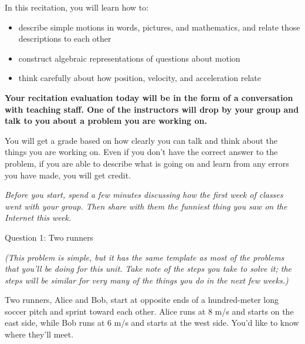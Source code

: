 \documentclass[12pt]{article}
\newcommand{\BI}{\begin{itemize}}
\newcommand{\EI}{\end{itemize}}
\def\BS{\bigskip}
\begin{document}
\Large
\centerline{}
\normalsize
\centerline{}

\medskip

\BS\BS\BS

In this recitation, you will learn how to:

\BI
\item describe simple motions in words, pictures, and mathematics, and relate those descriptions to each other
\item construct algebraic representations of questions about motion
\item think carefully about how position, velocity, and acceleration relate
\EI



\bf Your recitation evaluation today will be in the form of a conversation with teaching staff. One of the instructors will drop by your group and talk to you about a problem you are working on.
\BS


You will get a grade based on how clearly you can talk and think about the things you are working on. Even if you don't have the correct answer to the problem, if you are able to describe what is going on and learn from any errors you have made, you will get credit.

	


\vfill

\normalsize

\it Before you start, spend a few minutes discussing how the first week of classes went with your group. Then share with them the funniest thing you saw on the Internet this week. 

\newpage

\centerline{\Large Question 1: Two runners}

\begin{center}
\it (This problem is simple, but it has the same template as most of the problems that you'll be doing for this unit. Take note of the steps you take to solve it; the steps will be similar for very many of the things you do in the next few weeks.)

\end{center}
\rm
Two runners, Alice and Bob, start at opposite ends of a hundred-meter long soccer pitch and sprint toward each other. Alice runs at 8 m/s and starts on the east side, while Bob runs at 6 m/s and starts at the west side. You'd like to know where they'll meet.
\end{document}
